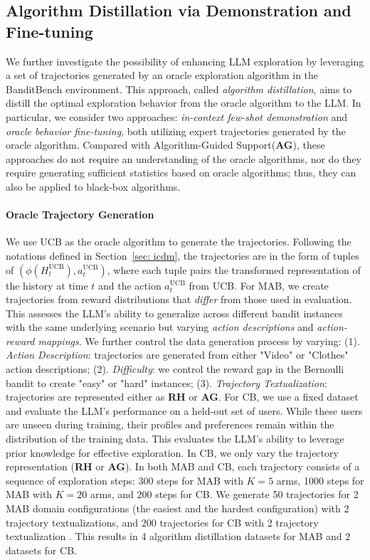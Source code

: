 \documentclass[11pt, logo]{googledeepmind}
\newcommand{\RH}{\textbf{RH}\xspace}
\newcommand{\AG}{\textbf{AG}\xspace}
\newcommand{\ag}{Algorithm-Guided Support\xspace}
\newcommand{\ad}{algorithm distillation\xspace}
\theoremstyle{plain}
\theoremstyle{definition}
\begin{document}
\subsection{Algorithm Distillation via Demonstration and Fine-tuning}
\label{subsec: learning_optimal_behavior}
We further investigate the possibility of enhancing LLM exploration by leveraging a set of trajectories generated by an oracle exploration algorithm in the BanditBench environment.
This approach, called \emph{\ad}, aims to distill the optimal exploration behavior from the oracle algorithm to the LLM.
In particular, we consider two approaches: \emph{in-context few-shot demonstration} and \emph{oracle behavior fine-tuning}, both utilizing expert trajectories generated by the oracle algorithm.
Compared with \ag (\textbf{AG}), these approaches do not require an understanding of the oracle algorithms, nor do they require generating sufficient statistics based on oracle algorithms; thus, they can also be applied to black-box algorithms.
\paragraph{Oracle Trajectory Generation}
We use UCB as the oracle algorithm to generate the trajectories.
Following the notations defined in Section~\ref{sec: icdm}, the trajectories are in the form of tuples of $( \phi(H^{\text{UCB}}_t), a^{\text{UCB}}_t)$, where each tuple pairs the transformed representation of the history at time $t$ and the action $a^{\text{UCB}}_t$ from UCB.
For MAB, we create trajectories from reward distributions that \textit{differ} from those used in evaluation. This assesses the LLM's ability to generalize across different bandit instances with the same underlying scenario but varying \textit{action descriptions} and \textit{action-reward mappings}.
We further control the data generation process by varying: (1). \emph{Action Description}: trajectories are generated from either "Video" or "Clothes" action descriptions;
(2). \emph{Difficulty}: we control the reward gap in the Bernoulli bandit to create "easy" or "hard" instances;
(3). \emph{Trajectory Textualization}: trajectories are represented either as \RH or \AG.
For CB, we use a fixed dataset and evaluate the LLM's performance on a held-out set of users. While these users are unseen during training, their profiles and preferences remain within the distribution of the training data. This evaluates the LLM's ability to leverage prior knowledge for effective exploration.  In CB, we only vary the trajectory representation (\RH or \AG).
In both MAB and CB, each trajectory consists of a sequence of exploration steps: 300 steps for MAB with $K=5$ arms, 1000 steps for MAB with $K=20$ arms, and 200 steps for CB.
We generate 50 trajectories for 2 MAB domain configurations (the easiest and the hardest configuration) with 2 trajectory textualizations, and 200 trajectories for CB with 2 trajectory textualization . This results in 4 \ad datasets for MAB and 2 datasets for CB.
\end{document}
